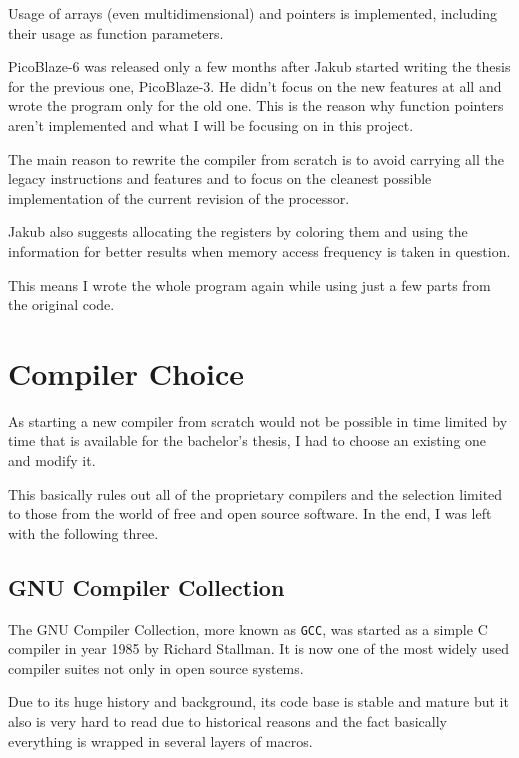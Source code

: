     Usage of arrays (even multidimensional) and pointers is implemented, including their usage as function parameters.

    PicoBlaze-6 was released only a few months after Jakub started writing the thesis for the previous one, PicoBlaze-3. 
    He didn't focus on the new features at all and wrote the program only for the old one.
    This is the reason why function pointers aren't implemented and what I will be focusing on in this project.

    The main reason to rewrite the compiler from scratch is to avoid carrying all the legacy instructions and features and to focus on the cleanest possible implementation of the current revision of the processor.

    Jakub also suggests allocating the registers by coloring them and using the information for better results when memory access frequency is taken in question.

    This means I wrote the whole program again while using just a few parts from the original code.

\chapter{Compiler Choice}\label{compiler}

As starting a new compiler from scratch would not be possible in time limited by time that is available for the bachelor's thesis, I had to choose an existing one and modify it.

This basically rules out all of the proprietary compilers and the selection limited to those from the world of free and open source software. In the end, I was left with the following three.


    \section{GNU Compiler Collection}

    The GNU Compiler Collection, more known as \texttt{GCC}, was started as a simple C compiler in year 1985 by Richard Stallman. It is now one of the most widely used compiler suites not only in open source systems.

    Due to its huge history and background, its code base is stable and mature but it also is very hard to read due to historical reasons and the fact basically everything is wrapped in several layers of macros.

